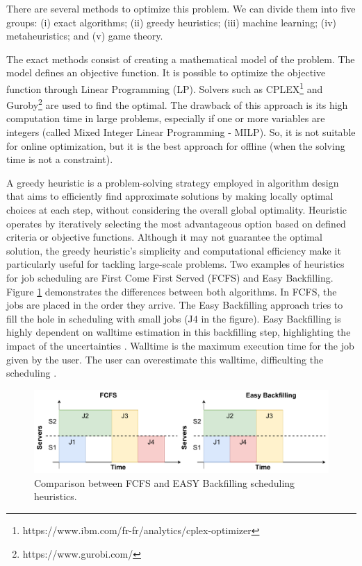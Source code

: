 There are several methods to optimize this problem. We can divide them into five groups: (i) exact algorithms; (ii) greedy heuristics; (iii) machine learning; (iv) metaheuristics; and (v) game theory.

The exact methods consist of creating a mathematical model of the problem. The model defines an objective function. It is possible to optimize the objective function through Linear Programming (LP). Solvers such as CPLEX\footnote{https://www.ibm.com/fr-fr/analytics/cplex-optimizer} and Guroby\footnote{https://www.gurobi.com/} are used to find the optimal. The drawback of this approach is its high computation time in large problems, especially if one or more variables are integers (called Mixed Integer Linear Programming - MILP). So, it is not suitable for online optimization, but it is the best approach for offline (when the solving time is not a constraint). 

A greedy heuristic is a problem-solving strategy employed in algorithm design that aims to efficiently find approximate solutions by making locally optimal choices at each step, without considering the overall global optimality. Heuristic operates by iteratively selecting the most advantageous option based on defined criteria or objective functions. Although it may not guarantee the optimal solution, the greedy heuristic's simplicity and computational efficiency make it particularly useful for tackling large-scale problems. Two examples of heuristics for job scheduling are First Come First Served (FCFS) and Easy Backfilling. Figure \ref{fig:backfilling} demonstrates the differences between both algorithms. In FCFS, the jobs are placed in the order they arrive. The Easy Backfilling approach tries to fill the hole in scheduling with small jobs (J4 in the figure). Easy Backfilling is highly dependent on walltime estimation in this backfilling step, highlighting the impact of the uncertainties \cite{srinivasan2002characterization, takizawa2020effect}. Walltime is the maximum execution time for the job given by the user. The user can overestimate this walltime, difficulting the scheduling \cite{takizawa2020effect}.

\begin{figure}[!htb]
    \centering
    \includegraphics[scale=0.6]{Images/Related_works/backfilling.pdf}
    \caption{Comparison between FCFS and EASY Backfilling scheduling heuristics.}
    \label{fig:backfilling}
\end{figure}

